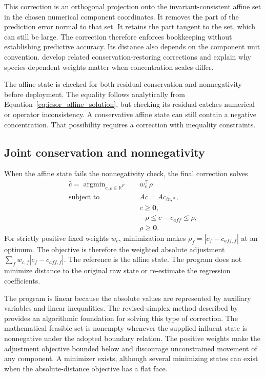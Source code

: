 This correction is an orthogonal projection onto the invariant-consistent affine set in the chosen numerical component coordinates. It removes the part of the prediction error normal to that set. It retains the part tangent to the set, which can still be large. The correction therefore enforces bookkeeping without establishing predictive accuracy. Its distance also depends on the component unit convention. \citet{SturmSilva2024} develop related conservation-restoring corrections and explain why species-dependent weights matter when concentration scales differ.

The affine state is checked for both residual conservation and nonnegativity before deployment. The equality follows analytically from Equation~\eqref{eq:icsor_affine_solution}, but checking its residual catches numerical or operator inconsistency. A conservative affine state can still contain a negative concentration. That possibility requires a correction with inequality constraints.

\subsection{Joint conservation and nonnegativity}

When the affine state fails the nonnegativity check, the final correction solves
\begin{equation}
\label{eq:icsor_weighted_correction}
\begin{aligned}
\widehat c =\mathop{\arg\min}_{c,\rho\in\mathbb{R}^{F}}\quad
& w_c^\top\rho\\
\text{subject to}\quad
& Ac=Ac_{in,*},\\
& c\geq\mathbf{0},\\
& -\rho\leq c-c_{aff}\leq\rho,\\
& \rho\geq\mathbf{0}.
\end{aligned}
\end{equation}
For strictly positive fixed weights \(w_c\), minimization makes \(\rho_f=|c_f-c_{aff,f}|\) at an optimum. The objective is therefore the weighted absolute adjustment \(\sum_f w_{c,f}|c_f-c_{aff,f}|\). The reference is the affine state. The program does not minimize distance to the original raw state or re-estimate the regression coefficients.

The program is linear because the absolute values are represented by auxiliary variables and linear inequalities. The revised-simplex method described by \citet{HuangfuHall2018} provides an algorithmic foundation for solving this type of correction. The mathematical feasible set is nonempty whenever the supplied influent state is nonnegative under the adopted boundary relation. The positive weights make the adjustment objective bounded below and discourage unconstrained movement of any component. A minimizer exists, although several minimizing states can exist when the absolute-distance objective has a flat face.

